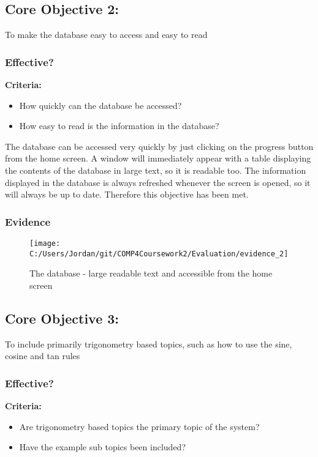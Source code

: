 \subsection{Core Objective 2: }

To make the database easy to access and easy to read

\subsubsection{Effective?}

\textbf{Criteria: }

\begin{itemize}
	\item How quickly can the database be accessed?
	\item How easy to read is the information in the database?
\end{itemize}

The database can be accessed very quickly by just clicking on the progress button from the home screen. A window will immediately appear with a table displaying the contents of the database in large text, so it is readable too. The information displayed in the database is always refreshed whenever the screen is opened, so it will always be up to date. Therefore this objective has been met.

\subsubsection{Evidence}

\begin{figure}[H]
	\texttt{[image: C:/Users/Jordan/git/COMP4Coursework2/Evaluation/evidence\_2]}
	\caption{The database - large readable text and accessible from the home screen}
\end{figure}

\subsection{Core Objective 3: }

To include primarily trigonometry based topics, such as how to use the sine, cosine and tan rules

\subsubsection{Effective?}

\textbf{Criteria: }

\begin{itemize}
	\item Are trigonometry based topics the primary topic of the system?
	\item Have the example sub topics been included?
\end{itemize}

